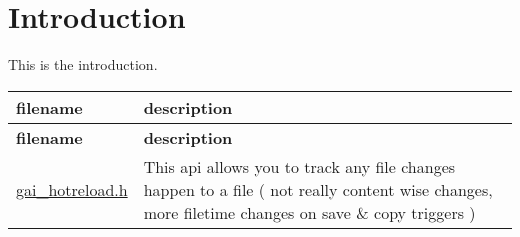 \hypertarget{index_intro_sec}{}\section{Introduction}\label{index_intro_sec}
This is the introduction.

\tabulinesep=1mm
\begin{longtabu} spread 0pt [c]{*{2}{|X[-1]}|}
\hline
\rowcolor{\tableheadbgcolor}\textbf{ filename }&\textbf{ description  }\\
\endfirsthead
\hline
\endfoot
\hline
\rowcolor{\tableheadbgcolor}\textbf{ filename }&\textbf{ description  }\\
\endhead
\hyperlink{gai__hotreload_8h}{gai\+\_\+hotreload.\+h} &This api allows you to track any file changes happen to a file ( not really content wise changes, more filetime changes on save \& copy triggers ) \\
\end{longtabu}
